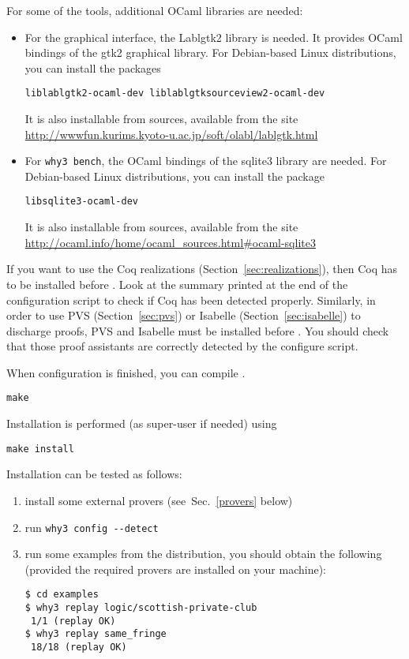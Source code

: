 \noindent
For some of the \why tools, additional OCaml libraries are needed:
\begin{itemize}
\item For the graphical interface, the Lablgtk2 library is needed.
  It provides OCaml
  bindings of the gtk2 graphical library. For Debian-based Linux
  distributions, you can install the packages
\begin{verbatim}
liblablgtk2-ocaml-dev liblablgtksourceview2-ocaml-dev
\end{verbatim}
It is also installable from sources, available from the site
\url{http://wwwfun.kurims.kyoto-u.ac.jp/soft/olabl/lablgtk.html}

\item For \texttt{why3 bench}, the OCaml bindings of the sqlite3 library
are needed.
For Debian-based Linux distributions, you can install the package
\begin{verbatim}
libsqlite3-ocaml-dev
\end{verbatim}
It is also installable from sources, available from the site
\url{http://ocaml.info/home/ocaml_sources.html#ocaml-sqlite3}
\end{itemize}


If you want to use the Coq realizations
(Section~\ref{sec:realizations}), then Coq has to be installed before
\why. Look at the summary printed at the end of the configuration
script to check if Coq has been detected properly. Similarly, in order to
use PVS (Section~\ref{sec:pvs}) or Isabelle (Section~\ref{sec:isabelle})
to discharge proofs, PVS and Isabelle must be
installed before \why. You should check that those proof assistants
are correctly detected by the configure script.

When configuration is finished, you can compile \why.
\begin{verbatim}
make
\end{verbatim}
Installation is performed (as super-user if needed) using
\begin{verbatim}
make install
\end{verbatim}
Installation can be tested as follows:
\begin{enumerate}
\item install some external provers (see~Sec.~\ref{provers} below)
\item run \verb|why3 config --detect|
\item run some examples from the distribution, \eg you should
obtain the following (provided the required provers are installed on
your machine):
\begin{verbatim}
$ cd examples
$ why3 replay logic/scottish-private-club
 1/1 (replay OK)
$ why3 replay same_fringe
 18/18 (replay OK)
\end{verbatim}
\end{enumerate}


